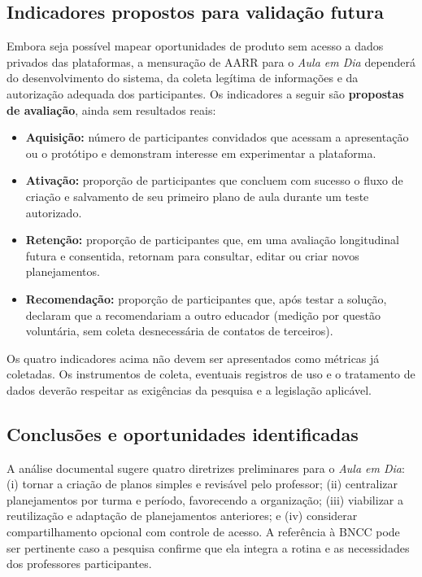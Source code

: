 \documentclass[12pt,a4paper,oneside]{report}
\begin{document}
\subsection{Indicadores propostos para validação futura}
Embora seja possível mapear oportunidades de produto sem acesso a dados privados das plataformas, a mensuração de AARR para o \textit{Aula em Dia} dependerá do desenvolvimento do sistema, da coleta legítima de informações e da autorização adequada dos participantes. Os indicadores a seguir são \textbf{propostas de avaliação}, ainda sem resultados reais:
\begin{itemize}
  \item \textbf{Aquisição:} número de participantes convidados que acessam a apresentação ou o protótipo e demonstram interesse em experimentar a plataforma.
  \item \textbf{Ativação:} proporção de participantes que concluem com sucesso o fluxo de criação e salvamento de seu primeiro plano de aula durante um teste autorizado.
  \item \textbf{Retenção:} proporção de participantes que, em uma avaliação longitudinal futura e consentida, retornam para consultar, editar ou criar novos planejamentos.
  \item \textbf{Recomendação:} proporção de participantes que, após testar a solução, declaram que a recomendariam a outro educador (medição por questão voluntária, sem coleta desnecessária de contatos de terceiros).
\end{itemize}
Os quatro indicadores acima não devem ser apresentados como métricas já coletadas. Os instrumentos de coleta, eventuais registros de uso e o tratamento de dados deverão respeitar as exigências da pesquisa e a legislação aplicável.

\subsection{Conclusões e oportunidades identificadas}
A análise documental sugere quatro diretrizes preliminares para o \textit{Aula em Dia}: (i) tornar a criação de planos simples e revisável pelo professor; (ii) centralizar planejamentos por turma e período, favorecendo a organização; (iii) viabilizar a reutilização e adaptação de planejamentos anteriores; e (iv) considerar compartilhamento opcional com controle de acesso. A referência à BNCC pode ser pertinente caso a pesquisa confirme que ela integra a rotina e as necessidades dos professores participantes.
\end{document}

